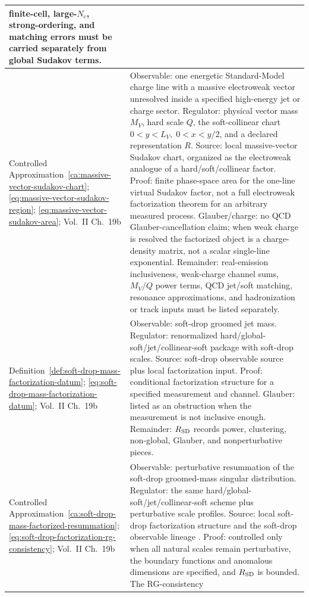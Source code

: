 {\begin{longtable}{@{}>{\raggedright\arraybackslash}p{}>{\raggedright\arraybackslash}p{}@{}}
finite-cell, large-\(N_c\), strong-ordering, and matching errors must be
carried separately from global Sudakov terms.
\\ \hline
Controlled Approximation~\ref{ca:massive-vector-sudakov-chart};
\eqref{eq:massive-vector-sudakov-region};
\eqref{eq:massive-vector-sudakov-area};
Vol.~II Ch.~19b &
Observable: one energetic Standard-Model charge line with a massive
electroweak vector unresolved inside a specified high-energy jet or charge
sector.  Regulator: physical vector mass \(M_V\), hard scale \(Q\), the
soft-collinear chart \(0<y<L_V,\;0<x<y/2\), and a declared representation
\(R\).  Source: local massive-vector Sudakov chart, organized as the
electroweak analogue of a hard/soft/collinear factor.  Proof: finite
phase-space area for the one-line virtual Sudakov factor, not a full
electroweak factorization theorem for an arbitrary measured process.
Glauber/charge: no QCD Glauber-cancellation claim; when weak charge is
resolved the factorized object is a charge-density matrix, not a scalar
single-line exponential.  Remainder: real-emission inclusiveness, weak-charge
channel sums, \(M_V/Q\) power terms, QCD jet/soft matching, resonance
approximations, and hadronization or track inputs must be listed separately.
\\ \hline
Definition~\ref{def:soft-drop-mass-factorization-datum};
\eqref{eq:soft-drop-mass-factorization-datum};
Vol.~II Ch.~19b &
Observable: soft-drop groomed jet mass.  Regulator: renormalized
hard/global-soft/jet/collinear-soft package with soft-drop scales.  Source:
soft-drop observable source \cite{LarkoskiMarzaniSoyezThaler2014SoftDrop}
plus local factorization input.  Proof: conditional factorization structure
for a specified measurement and channel.  Glauber: listed as an obstruction
when the measurement is not inclusive enough.  Remainder: \(R_{\rm SD}\)
records power, clustering, non-global, Glauber, and nonperturbative pieces.
\\ \hline
Controlled Approximation~\ref{ca:soft-drop-mass-factorized-resummation};
\eqref{eq:soft-drop-factorization-rg-consistency};
Vol.~II Ch.~19b &
Observable: perturbative resummation of the soft-drop groomed-mass singular
distribution.  Regulator: the same hard/global-soft/jet/collinear-soft scheme
plus perturbative scale profiles.  Source: local soft-drop factorization
structure and the soft-drop observable lineage
\cite{LarkoskiMarzaniSoyezThaler2014SoftDrop}.  Proof: controlled only when
all natural scales remain perturbative, the boundary functions and anomalous
dimensions are specified, and \(R_{\rm SD}\) is bounded.  The RG-consistency

\end{longtable}}
